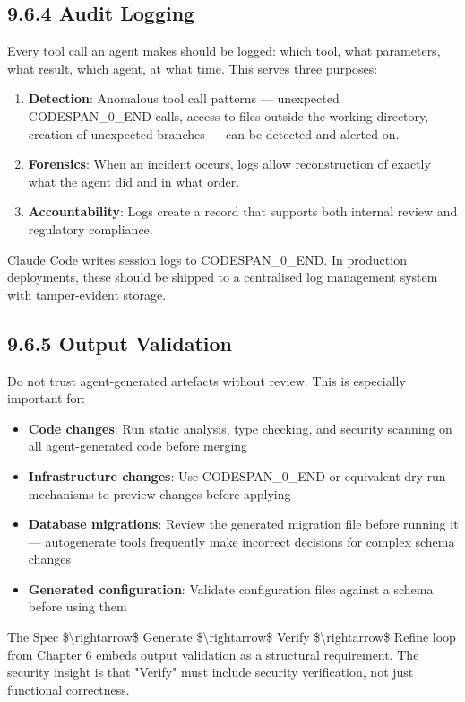 \documentclass[11pt,a4paper]{book}
\begin{document}
\subsection{9.6.4 Audit Logging}

Every tool call an agent makes should be logged: which tool, what parameters, what result, which agent, at what time. This serves three purposes:

\begin{enumerate}
  \item \textbf{Detection}: Anomalous tool call patterns --- unexpected CODESPAN\_0\_END calls, access to files outside the working directory, creation of unexpected branches --- can be detected and alerted on.
  \item \textbf{Forensics}: When an incident occurs, logs allow reconstruction of exactly what the agent did and in what order.
  \item \textbf{Accountability}: Logs create a record that supports both internal review and regulatory compliance.
\end{enumerate}

Claude Code writes session logs to CODESPAN\_0\_END. In production deployments, these should be shipped to a centralised log management system with tamper-evident storage.

\subsection{9.6.5 Output Validation}

Do not trust agent-generated artefacts without review. This is especially important for:

\begin{itemize}
  \item \textbf{Code changes}: Run static analysis, type checking, and security scanning on all agent-generated code before merging
  \item \textbf{Infrastructure changes}: Use CODESPAN\_0\_END or equivalent dry-run mechanisms to preview changes before applying
  \item \textbf{Database migrations}: Review the generated migration file before running it --- autogenerate tools frequently make incorrect decisions for complex schema changes
  \item \textbf{Generated configuration}: Validate configuration files against a schema before using them
\end{itemize}

The Spec \$\textbackslash{}rightarrow\$ Generate \$\textbackslash{}rightarrow\$ Verify \$\textbackslash{}rightarrow\$ Refine loop from Chapter 6 embeds output validation as a structural requirement. The security insight is that "Verify" must include security verification, not just functional correctness.
\end{document}
